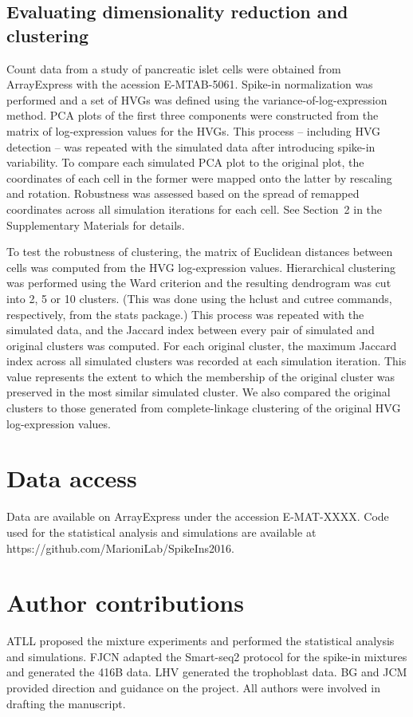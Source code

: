 \documentclass{article}
\newcommand{\suppsecsim}{2}
\begin{document}
\subsection{Evaluating dimensionality reduction and clustering}
Count data from a study of pancreatic islet cells \cite{segerstople2016single} were obtained from ArrayExpress with the acession E-MTAB-5061.
Spike-in normalization was performed and a set of HVGs was defined using the variance-of-log-expression method.
PCA plots of the first three components were constructed from the matrix of log-expression values for the HVGs.
This process -- including HVG detection -- was repeated with the simulated data after introducing spike-in variability.
To compare each simulated PCA plot to the original plot, the coordinates of each cell in the former were mapped onto the latter by rescaling and rotation.
Robustness was assessed based on the spread of remapped coordinates across all simulation iterations for each cell.
See Section~\suppsecsim{} in the Supplementary Materials for details.

To test the robustness of clustering, the matrix of Euclidean distances between cells was computed from the HVG log-expression values. 
Hierarchical clustering was performed using the Ward criterion and the resulting dendrogram was cut into 2, 5 or 10 clusters.
(This was done using the hclust and cutree commands, respectively, from the stats package.)
This process was repeated with the simulated data, and the Jaccard index between every pair of simulated and original clusters was computed.
For each original cluster, the maximum Jaccard index across all simulated clusters was recorded at each simulation iteration.
This value represents the extent to which the membership of the original cluster was preserved in the most similar simulated cluster.
We also compared the original clusters to those generated from complete-linkage clustering of the original HVG log-expression values.

\section{Data access}
Data are available on ArrayExpress under the accession E-MAT-XXXX.
Code used for the statistical analysis and simulations are available at https://github.com/MarioniLab/SpikeIns2016.

\section{Author contributions}
ATLL proposed the mixture experiments and performed the statistical analysis and simulations.
FJCN adapted the Smart-seq2 protocol for the spike-in mixtures and generated the 416B data.
LHV generated the trophoblast data.
BG and JCM provided direction and guidance on the project.
All authors were involved in drafting the manuscript.
\end{document}
